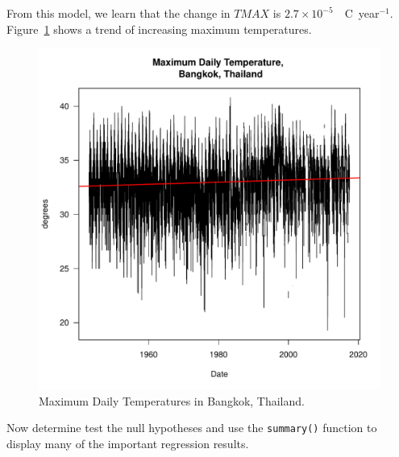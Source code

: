 \documentclass{article}\usepackage[]{graphicx}\usepackage[]{color}
\makeatletter
\def\maxwidth{ %
  \ifdim\Gin@nat@width>\linewidth
    \linewidth
  \else
    \Gin@nat@width
  \fi
}
\newenvironment{knitrout}{}{} %
\makeatother
\begin{document}
From this model, we learn that the change in $TMAX$ is 
\ensuremath{2.7\times 10^{-5}}~\degree~C~year$^{-1}$. Figure~\ref{fig:TMAX_trend} shows a trend of increasing maximum temperatures.

\begin{figure}
\caption{Maximum Daily Temperatures in Bangkok, Thailand.}
\label{fig:TMAX_trend}
\begin{knitrout}
\color{fgcolor}
\includegraphics[width=\maxwidth]{figure/unnamed-chunk-3-1} 

\end{knitrout}
\end{figure}

Now determine test the null hypotheses and use the \texttt{summary()} function to display many of the important regression results.
\end{document}
